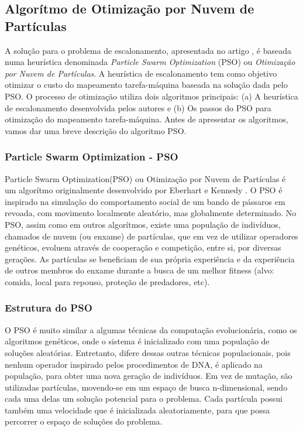 \documentclass[a4paper,10pt]{article}
\begin{document}
\subsection{Algorítmo de Otimização por Nuvem de Partículas}
\label{psoalgo}
A solução para o problema de escalonamento, apresentada no artigo \cite{pso_a}, é baseada numa heurística 
denominada \emph{Particle Swarm Optimization} (PSO) ou \emph{Otimização por Nuvem de Partículas}. A heurística de 
escalonamento tem como objetivo otimizar 
o custo do mapeamento tarefa-máquina baseada na solução dada pelo PSO. O processo de otimização utiliza 
dois algoritmos principais: (a) A heurística de escalonamento desenvolvida pelos autores e (b) Os passos do PSO 
para otimização do mapeamento tarefa-máquina. Antes de apresentar os algoritmos, vamos 
dar uma breve descrição do algoritmo PSO.

\subsubsection{Particle Swarm Optimization - PSO}

Particle Swarm Optimization(PSO) ou Otimização por Nuvem de Partículas é um algorítmo originalmente 
desenvolvido por Eberhart e Kennedy \cite{pso_article}. O PSO é inspirado na simulação do comportamento social de um 
bando de pássaros em revoada, com movimento localmente aleatório, mas globalmente determinado. No PSO, 
assim como em outros algorítmos, existe uma população de indivíduos, chamados de nuvem (ou enxame) de 
partículas, que em vez de utilizar operadores genéticos, evoluem através de cooperação e competição, entre si, 
por diversas gerações. As partículas se beneficiam de sua própria experiência e da experiência de outros membros 
do enxame durante a busca de um melhor fitness (alvo: comida, local para repouso, proteção de predadores, etc).

\subsubsection{Estrutura do PSO}

O PSO é muito similar a algumas técnicas da computação evolucionária, como os algoritmos genéticos, onde o 
sistema é inicializado com uma população de soluções aleatórias. Entretanto, difere dessas outras técnicas 
populacionais, pois nenhum operador inspirado pelos procedimentos de DNA, é aplicado na população, para obter 
uma nova geração de indivíduos. Em vez de mutação, são utilizadas partículas, movendo-se em um espaço de busca 
n-dimensional, sendo cada uma delas um solução potencial para o problema. Cada partícula possui também uma 
velocidade que é inicializada aleatoriamente, para que possa percorrer o espaço de soluções do problema.
\end{document}
